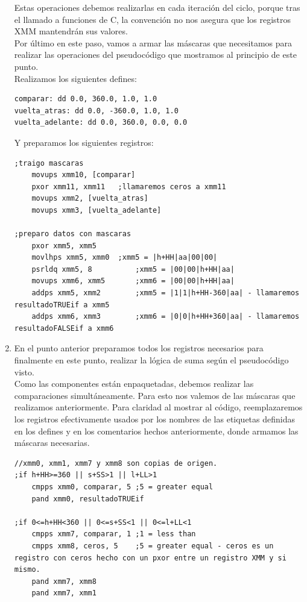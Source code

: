 \begin{enumerate}
Estas operaciones debemos realizarlas en cada iteración del ciclo, porque tras el llamado a funciones de C, la convención no nos asegura que los registros XMM mantendrán sus valores.\\
Por último en este paso, vamos a armar las máscaras que necesitamos para realizar las operaciones del pseudocódigo que mostramos al principio de este punto.\\
Realizamos los siguientes defines:\\
\begin{verbatim}
comparar: dd 0.0, 360.0, 1.0, 1.0
vuelta_atras: dd 0.0, -360.0, 1.0, 1.0
vuelta_adelante: dd	0.0, 360.0, 0.0, 0.0         
\end{verbatim}
Y preparamos los siguientes registros:
\begin{lstlisting}
;traigo mascaras
	movups xmm10, [comparar]
	pxor xmm11, xmm11	;llamaremos ceros a xmm11
	movups xmm2, [vuelta_atras]
	movups xmm3, [vuelta_adelante]

;preparo datos con mascaras
	pxor xmm5, xmm5
	movlhps xmm5, xmm0	;xmm5 = |h+HH|aa|00|00|
	psrldq xmm5, 8			;xmm5 = |00|00|h+HH|aa|
	movups xmm6, xmm5		;xmm6 = |00|00|h+HH|aa|
	addps xmm5, xmm2		;xmm5 = |1|1|h+HH-360|aa| - llamaremos resultadoTRUEif a xmm5
	addps xmm6, xmm3		;xmm6 = |0|0|h+HH+360|aa| - llamaremos resultadoFALSEif a xmm6

\end{lstlisting}

\item En el punto anterior preparamos todos los registros necesarios para finalmente en este punto, realizar la lógica de suma según el pseudocódigo visto.\\
Como las componentes están enpaquetadas, debemos realizar las comparaciones simultáneamente. Para esto nos valemos de las máscaras que realizamos anteriormente. Para claridad al mostrar al código, reemplazaremos los registros efectivamente usados por los nombres de las etiquetas definidas en los defines y en los comentarios hechos anteriormente, donde armamos las máscaras necesarias.

\begin{lstlisting}
//xmm0, xmm1, xmm7 y xmm8 son copias de origen.
;if h+HH>=360 || s+SS>1 || l+LL>1
	cmpps xmm0, comparar, 5	;5 = greater equal
	pand xmm0, resultadoTRUEif

;if 0<=h+HH<360 || 0<=s+SS<1 || 0<=l+LL<1
	cmpps xmm7, comparar, 1	;1 = less than
	cmpps xmm8, ceros, 5	;5 = greater equal - ceros es un registro con ceros hecho con un pxor entre un registro XMM y si mismo.
	pand xmm7, xmm8
	pand xmm7, xmm1


\end{lstlisting}
\end{enumerate}
